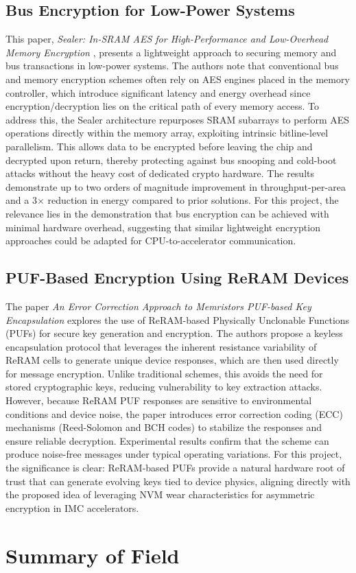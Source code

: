 \documentclass[sigconf,authoryear]{acmart}
\begin{document}
\subsection{Bus Encryption for Low-Power Systems}
This paper, \textit{Sealer: In-SRAM AES for High-Performance and Low-Overhead Memory Encryption} \cite{Sealer}, presents a lightweight
approach to securing memory and bus transactions in low-power systems. The authors note that conventional bus and memory encryption
schemes often rely on AES engines placed in the memory controller, which introduce significant latency and energy overhead since
encryption/decryption lies on the critical path of every memory access. To address this, the Sealer architecture repurposes SRAM
subarrays to perform AES operations directly within the memory array, exploiting intrinsic bitline-level parallelism. This allows
data to be encrypted before leaving the chip and decrypted upon return, thereby protecting against bus snooping and cold-boot attacks
without the heavy cost of dedicated crypto hardware. The results demonstrate up to two orders of magnitude improvement in throughput-per-area
and a 3$\times$ reduction in energy compared to prior solutions. For this project, the relevance lies in the demonstration that
bus encryption can be achieved with minimal hardware overhead, suggesting that similar lightweight encryption approaches
could be adapted for CPU-to-accelerator communication.

\subsection{PUF-Based Encryption Using ReRAM Devices}
The paper \textit{An Error Correction Approach to Memristors PUF-based Key Encapsulation} \cite{ReRAM_PUF} explores the use of
ReRAM-based Physically Unclonable Functions (PUFs) for secure key generation and encryption. The authors propose a keyless
encapsulation protocol that leverages the inherent resistance variability of ReRAM cells to generate unique device responses,
which are then used directly for message encryption. Unlike traditional schemes, this avoids the need for stored cryptographic
keys, reducing vulnerability to key extraction attacks. However, because ReRAM PUF responses are sensitive to environmental
conditions and device noise, the paper introduces error correction coding (ECC) mechanisms (Reed-Solomon and BCH codes) to
stabilize the responses and ensure reliable decryption. Experimental results confirm that the scheme can produce noise-free
messages under typical operating variations. For this project, the significance is clear: ReRAM-based PUFs provide a natural
hardware root of trust that can generate evolving keys tied to device physics, aligning directly with the proposed idea of
leveraging NVM wear characteristics for asymmetric encryption in IMC accelerators.

\section{Summary of Field}
\begin{comment}
    - field summary
    - paragraph
\end{comment}




\end{document}
